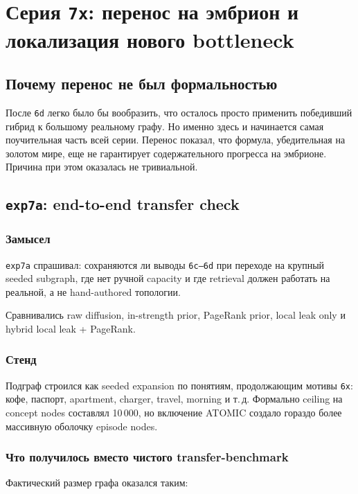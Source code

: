 \chapter{Серия \texttt{7x}: перенос на эмбрион и локализация нового bottleneck}

\section{Почему перенос не был формальностью}

После \texttt{6d} легко было бы вообразить, что осталось просто применить
победивший гибрид к большому реальному графу. Но именно здесь и начинается самая
поучительная часть всей серии. Перенос показал, что формула, убедительная на
золотом мире, еще не гарантирует содержательного прогресса на эмбрионе. Причина
при этом оказалась не тривиальной.

\section{\texttt{exp7a}: end-to-end transfer check}

\subsection{Замысел}

\texttt{exp7a} спрашивал: сохраняются ли выводы \texttt{6c--6d} при переходе на
крупный seeded subgraph, где нет ручной capacity и где retrieval должен работать
на реальной, а не hand-authored топологии.

Сравнивались raw diffusion, in-strength prior, PageRank prior, local leak only и
hybrid local leak + PageRank.

\subsection{Стенд}

Подграф строился как seeded expansion по понятиям, продолжающим мотивы
\texttt{6x}: кофе, паспорт, apartment, charger, travel, morning и т.\,д.
Формально ceiling на concept nodes составлял 10\,000, но включение ATOMIC
создало гораздо более массивную оболочку episode nodes.

\subsection{Что получилось вместо чистого transfer-benchmark}

Фактический размер графа оказался таким:

